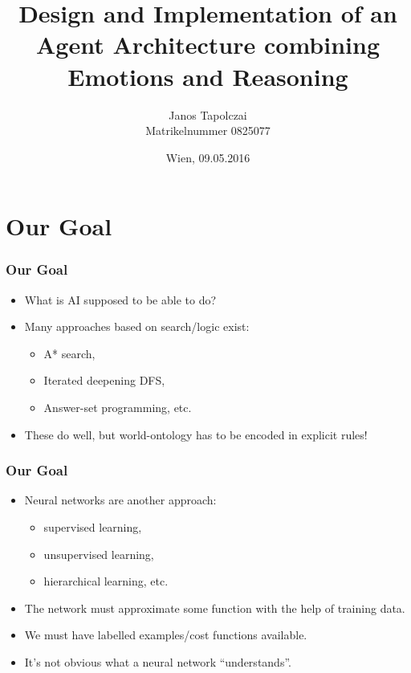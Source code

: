 \documentclass[handout]{beamer}
\title{Design and Implementation of an Agent Architecture combining Emotions and Reasoning}
\author{Janos Tapolczai \\
   Matrikelnummer 0825077 \\
}
\date{Wien, 09.05.2016}
\begin{document}
   
   \begin{frame}
      \titlepage
   \end{frame}
   
   \section{Our Goal}
   
   \begin{frame}
	   	\frametitle{Our Goal}
	   	
	   	\begin{itemize}
	   		\item What is AI supposed to be able to do?
	   		\pause
	   		\item Many approaches based on search/logic exist:
		   		\begin{itemize}
		   			\item A* search,
		   			\item Iterated deepening DFS,
		   			\item Answer-set programming, etc.
		   		\end{itemize}
		   	\pause
		   	\item These do well, but world-ontology has to be encoded in explicit rules!
	   	\end{itemize}
   \end{frame}
   
   \begin{frame}
   	\frametitle{Our Goal}
   	
   	\begin{itemize}
   		\item Neural networks are another approach:
   		\begin{itemize}
   			\item supervised learning,
   			\item unsupervised learning,
   			\item hierarchical learning, etc.
   		\end{itemize}
   		\pause
   		\item The network must approximate some function with the help of training data.
   		\pause
   		\item We must have labelled examples/cost functions available.
   		\pause
   		\item It's not obvious what a neural network ``understands''.
   	\end{itemize}
   \end{frame}
   
\end{document}
